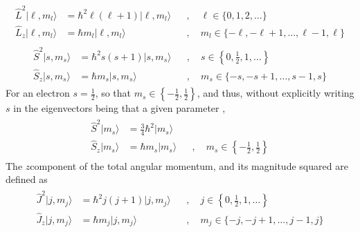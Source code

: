 \documentclass[letterpaper,10pt,english]{jupyterBook}
\begin{document}
\sphinxAtStartPar
{}
\begin{equation*}
\begin{split}\begin{aligned}
  \hat{L}^2 | \ell, m_l \rangle & = \hbar^2 \ell (\ell+1) | \ell, m_l \rangle && , \quad \ell \in \{ 0, 1, 2, \dots \} \\
  \hat{L}_z | \ell, m_l \rangle & = \hbar m_l             | \ell, m_l \rangle && , \quad m_l  \in \{ - \ell, - \ell+1, \dots, \ell-1, \ell \}
\end{aligned}\end{split}
\end{equation*}
\sphinxAtStartPar
{}
\begin{equation*}
\begin{split}\begin{aligned}
  \hat{S}^2 |   s, m_s \rangle & = \hbar^2 s    (s   +1) | s, m_s \rangle && , \quad s   \in \left\{ 0, \frac{1}{2}, 1, \dots \right\} \\
  \hat{S}_z |   s, m_s \rangle & = \hbar m_s             | s, m_s \rangle && , \quad m_s \in \{ - s, - s+1, \dots, s-1, s \}
\end{aligned}\end{split}
\end{equation*}
\sphinxAtStartPar
For an electron \(s = \frac{1}{2}\), so that \(m_s \in \left\{ - \frac{1}{2}, \frac{1}{2} \right\}\), and thus, without explicitly writing \(s\) in the eigenvectors \sphinxhyphen{} being that a given parameter \sphinxhyphen{},
\begin{equation*}
\begin{split}\begin{aligned}
  \hat{S}^2 | m_s \rangle & = \frac{3}{4}\hbar^2 | m_s \rangle && \\
  \hat{S}_z | m_s \rangle & = \hbar m_s          | m_s \rangle && , \quad m_s \in \left\{ -\frac{1}{2}, \frac{1}{2} \right\}
\end{aligned}\end{split}
\end{equation*}
\sphinxAtStartPar
{} The \(z\)\sphinxhyphen{}component of the total angular momentum, and its magnitude squared are defined as
\begin{equation*}
\begin{split}\begin{aligned}
  \hat{J}^2 |   j, m_j \rangle & = \hbar^2 j    (j   +1) | j, m_j \rangle && , \quad   j \in \left\{ 0, \frac{1}{2}, 1, \dots \right\} \\
  \hat{J}_z |   j, m_j \rangle & = \hbar m_j             | j, m_j \rangle && , \quad m_j \in \{ - j, - j+1, \dots, j-1, j \}
\end{aligned}\end{split}
\end{equation*}
\end{document}
